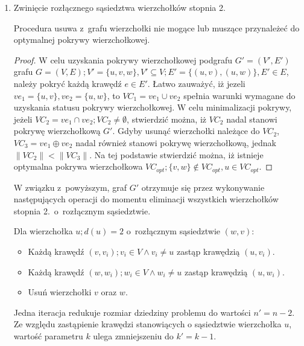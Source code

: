 \begin{enumerate}
  \item Zwinięcie rozłącznego sąsiedztwa wierzchołków stopnia 2.
    \begin{theorem}
      Procedura usuwa z~grafu wierzchołki nie mogące lub muszące przynależeć do 
      optymalnej pokrywy wierzchołkowej.
    \end{theorem}
    \begin{proof}
      W celu uzyskania pokrywy wierzchołkowej podgrafu $G\prime=(V\prime,E\prime)$
      grafu ${G=(V,E); V\prime=\{u, v, w\}, V\prime \subseteq V; E\prime=\{(u,v),
      (u,w)\}, E\prime \in E}$,
      należy pokryć każdą krawędź $e \in E\prime$. 
      Łatwo zauważyć, iż jezeli $ve_1=\{u,v\}, ve_2=\{u,w\}$, 
      to $VC_1=ve_1 \cup ve_2$ spełnia warunki wymagane do uzyskania statusu
      pokrywy wierzchołkowej.
      W celu minimalizacji pokrywy, jeżeli $VC_2=ve_1 \cap ve_2; VC_2 \neq \emptyset$,
      stwierdzić można, iż $VC_2$ nadal stanowi pokrywę wierzchołkową $G\prime$.
      Gdyby usunąć wierzchołki należące do $VC_2$, $VC_3=ve_1 \oplus ve_2$ nadal
      również stanowi pokrywę wierzchołkową, jednak $\|VC_2\| < \|VC_3\|$.
      Na tej podstawie stwierdzić można, iż istnieje optymalna pokrywa
      wierzchołkowa $VC_{opt}; \{v,w\} \notin VC_{opt}, u \in VC_{opt}$.
    \end{proof}

    W związku z~powyższym, graf $G\prime$ otrzymuje się przez wykonywanie
    następujących operacji do momentu eliminacji wszystkich wierzchołków stopnia
    2.\ o~rozłącznym sąsiedztwie.

    Dla wierzchołka $u; d(u)=2$ o~rozłącznym sąsiedztwie $(w,v)$:
    \begin{itemize}
      \item Każdą krawędź $(v,v_i); v_i \in V \land v_i \neq u$ zastąp 
        krawędzią $(u, v_i)$.
      \item Każdą krawędź $(w,w_i); w_i \in V \land w_i \neq u$ zastąp
        krawędzią $(u, w_i)$.
      \item Usuń wierzchołki $v$ oraz $w$.
    \end{itemize}
    Jedna iteracja redukuje rozmiar dziedziny problemu do wartości
    $n\prime=n-2$.
    Ze względu zastąpienie krawędzi stanowiących o sąsiedztwie wierzchołka $u$,
    wartość parametru $k$ ulega zmniejszeniu do $k\prime=k-1$.

\end{enumerate}

